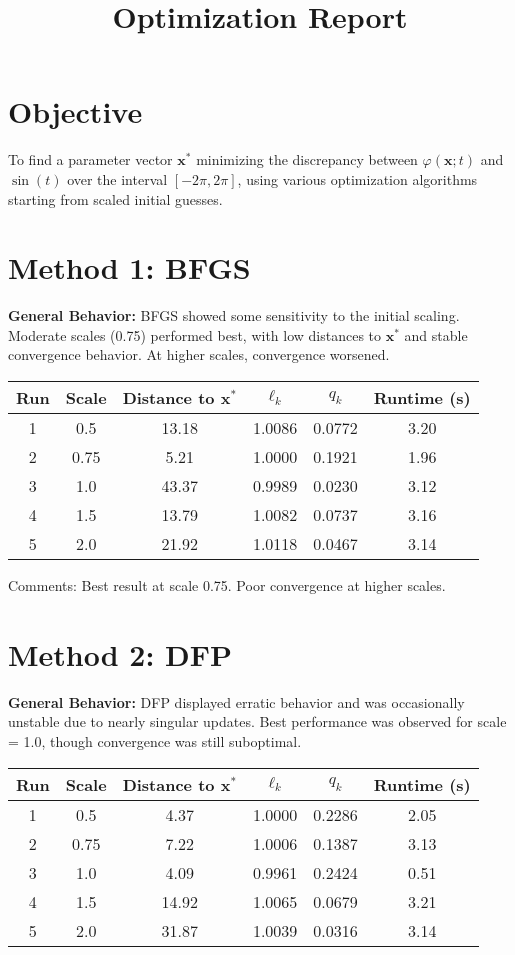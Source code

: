 \documentclass{article}
\title{Optimization Report}
\author{}
\date{}
\begin{document}
\maketitle

\section*{Objective}
To find a parameter vector $\mathbf{x}^*$ minimizing the discrepancy between $\varphi(\mathbf{x}; t)$ and $\sin(t)$ over the interval $[-2\pi, 2\pi]$, using various optimization algorithms starting from scaled initial guesses.

\section*{Method 1: BFGS}
\textbf{General Behavior:} BFGS showed some sensitivity to the initial scaling. Moderate scales (0.75) performed best, with low distances to $\mathbf{x}^*$ and stable convergence behavior. At higher scales, convergence worsened.

\begin{tabular}{cccccc}
\toprule
Run & Scale & Distance to $\mathbf{x}^*$ & $\ell_k$ & $q_k$ & Runtime (s) \\
\midrule
1 & 0.5  & 13.18 & 1.0086 & 0.0772 & 3.20 \\
2 & 0.75 & 5.21  & 1.0000 & 0.1921 & 1.96 \\
3 & 1.0  & 43.37 & 0.9989 & 0.0230 & 3.12 \\
4 & 1.5  & 13.79 & 1.0082 & 0.0737 & 3.16 \\
5 & 2.0  & 21.92 & 1.0118 & 0.0467 & 3.14 \\
\bottomrule
\end{tabular}

\vspace{0.5em}
Comments: Best result at scale 0.75. Poor convergence at higher scales.

\section*{Method 2: DFP}
\textbf{General Behavior:} DFP displayed erratic behavior and was occasionally unstable due to nearly singular updates. Best performance was observed for scale = 1.0, though convergence was still suboptimal.

\begin{tabular}{cccccc}
\toprule
Run & Scale & Distance to $\mathbf{x}^*$ & $\ell_k$ & $q_k$ & Runtime (s) \\
\midrule
1 & 0.5  & 4.37  & 1.0000 & 0.2286 & 2.05 \\
2 & 0.75 & 7.22  & 1.0006 & 0.1387 & 3.13 \\
3 & 1.0  & 4.09  & 0.9961 & 0.2424 & 0.51 \\
4 & 1.5  & 14.92 & 1.0065 & 0.0679 & 3.21 \\
5 & 2.0  & 31.87 & 1.0039 & 0.0316 & 3.14 \\
\bottomrule
\end{tabular}
\end{document}
